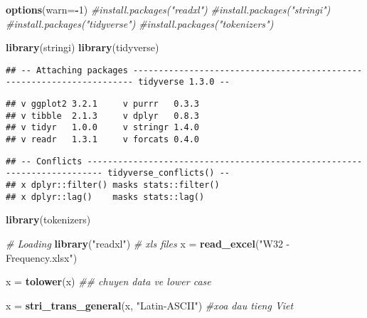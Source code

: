 \documentclass[]{article}
\title{}
\author{}
\date{}
\newenvironment{Shaded}{\begin{snugshade}}{\end{snugshade}}
\newcommand{\CommentTok}[1]{\textcolor[rgb]{0.56,0.35,0.01}{\textit{#1}}}
\newcommand{\DataTypeTok}[1]{\textcolor[rgb]{0.13,0.29,0.53}{#1}}
\newcommand{\DecValTok}[1]{\textcolor[rgb]{0.00,0.00,0.81}{#1}}
\newcommand{\KeywordTok}[1]{\textcolor[rgb]{0.13,0.29,0.53}{\textbf{#1}}}
\newcommand{\NormalTok}[1]{#1}
\newcommand{\OperatorTok}[1]{\textcolor[rgb]{0.81,0.36,0.00}{\textbf{#1}}}
\newcommand{\StringTok}[1]{\textcolor[rgb]{0.31,0.60,0.02}{#1}}
\begin{document}
\begin{Shaded}
\begin{Highlighting}[]
\KeywordTok{options}\NormalTok{(}\DataTypeTok{warn=}\OperatorTok{-}\DecValTok{1}\NormalTok{)}
\CommentTok{#install.packages("readxl")}
\CommentTok{#install.packages("stringi")}
\CommentTok{#install.packages("tidyverse")}
\CommentTok{#install.packages("tokenizers")}

\KeywordTok{library}\NormalTok{(stringi)}
\KeywordTok{library}\NormalTok{(tidyverse)}
\end{Highlighting}
\end{Shaded}

\begin{verbatim}
## -- Attaching packages ---------------------------------------------------------------------- tidyverse 1.3.0 --
\end{verbatim}

\begin{verbatim}
## v ggplot2 3.2.1     v purrr   0.3.3
## v tibble  2.1.3     v dplyr   0.8.3
## v tidyr   1.0.0     v stringr 1.4.0
## v readr   1.3.1     v forcats 0.4.0
\end{verbatim}

\begin{verbatim}
## -- Conflicts ------------------------------------------------------------------------- tidyverse_conflicts() --
## x dplyr::filter() masks stats::filter()
## x dplyr::lag()    masks stats::lag()
\end{verbatim}

\begin{Shaded}
\begin{Highlighting}[]
\KeywordTok{library}\NormalTok{(tokenizers)}

\CommentTok{# Loading}
\KeywordTok{library}\NormalTok{(}\StringTok{"readxl"}\NormalTok{)}
\CommentTok{# xls files}
\NormalTok{x =}\StringTok{ }\KeywordTok{read_excel}\NormalTok{(}\StringTok{"W32 - Frequency.xlsx"}\NormalTok{)}
\end{Highlighting}
\end{Shaded}

\begin{Shaded}
\begin{Highlighting}[]
\NormalTok{x =}\StringTok{ }\KeywordTok{tolower}\NormalTok{(x)  }\CommentTok{## chuyen data ve lower case}
\end{Highlighting}
\end{Shaded}

\begin{Shaded}
\begin{Highlighting}[]
\NormalTok{x =}\StringTok{ }\KeywordTok{stri_trans_general}\NormalTok{(x, }\StringTok{"Latin-ASCII"}\NormalTok{) }\CommentTok{#xoa dau tieng Viet}
\end{Highlighting}
\end{Shaded}
\end{document}

